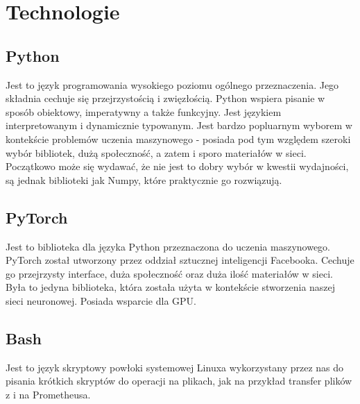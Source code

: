 \section{Technologie}

\subsection{Python}
Jest to język programowania wysokiego poziomu ogólnego przeznaczenia.
Jego składnia cechuje się przejrzystością i zwięzłością. Python wspiera pisanie w sposób obiektowy, 
imperatywny a także funkcyjny. Jest językiem interpretowanym i dynamicznie typowanym. Jest bardzo popluarnym 
wyborem w kontekście problemów uczenia maszynowego - posiada pod tym względem szeroki wybór bibliotek, 
dużą społeczność, a zatem i sporo materiałów w sieci.
Początkowo może się wydawać, że nie jest to dobry wybór w kwestii wydajności, 
są jednak biblioteki jak Numpy, które praktycznie go rozwiązują.

\subsection{PyTorch}
Jest to biblioteka dla języka Python przeznaczona do uczenia maszynowego. PyTorch \cite{pytorch} został utworzony
przez oddział sztucznej inteligencji Facebooka. Cechuje go przejrzysty interface, duża społeczność
oraz duża ilość materiałów w sieci. Była to jedyna biblioteka, która została użyta w kontekście 
stworzenia naszej sieci neuronowej. Posiada wsparcie dla GPU.

\subsection{Bash}
Jest to język skryptowy powłoki systemowej Linuxa wykorzystany przez nas do pisania krótkich skryptów
do operacji na plikach, jak na przykład transfer plików z i na Prometheusa.
